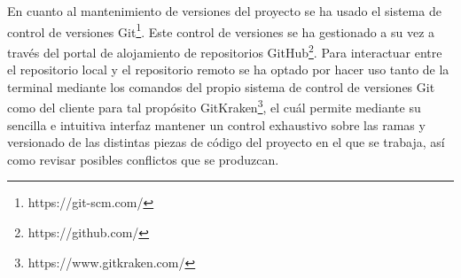 En cuanto al mantenimiento de versiones del proyecto se ha usado el sistema de control de versiones Git\footnote{https://git-scm.com/}. Este control de versiones se ha gestionado a su vez a través del portal de alojamiento de repositorios GitHub\footnote{https://github.com/}. Para interactuar entre el repositorio local y el repositorio remoto se ha optado por hacer uso tanto de la terminal mediante los comandos del propio sistema de control de versiones Git como del cliente para tal propósito GitKraken\footnote{https://www.gitkraken.com/}, el cuál permite mediante su sencilla e intuitiva interfaz mantener un control exhaustivo sobre las ramas y versionado de las distintas piezas de código del proyecto en el que se trabaja, así como revisar posibles conflictos que se produzcan.

